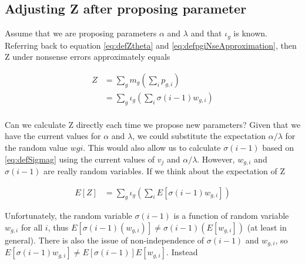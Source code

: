 \documentclass{article}
\newcommand{\elongWaitTime}{\ensuremath{w}\xspace}
\newcommand{\wgi}{\ensuremath{\elongWaitTime_{g,i}}\xspace}
\newcommand{\nseWaitTime}{\ensuremath{v}\xspace}
\newcommand{\vj}{\ensuremath{\nseWaitTime_{j}}\xspace}
\newcommand{\pgi}{\ensuremath{{p_{g,i}}}\xspace}
\newcommand{\mg}{\ensuremath{{m_g}}\xspace}
\begin{document}
\subsection*{Adjusting Z after proposing parameter}

Assume that we are proposing parameters $\alpha$ and $\lambda$ and that $\iota_g$ is known.
Referring back to equation \ref{eq:defZtheta} and \ref{eq:defpgiNseApproximation}, then Z under nonsense errors approximately equals

\begin{align}
Z &= \sum_g \mg \left(\sum_i \pgi\right)\\
 & = \sum_g \iota_g \left(\sum_i \sigma(i-1) \wgi \right) \\
\end{align}

Can we calculate Z directly each time we propose new parameters?
Given that we have the current values for $\alpha$ and $\lambda$, we could substitute the expectation $\alpha/\lambda$ for the random value $wgi$.
This would also allow us to calculate $\sigma(i-1)$ based on \ref{eq:defSigmag} using the current values of $\vj$ and $\alpha/\lambda$.
However, $\wgi$ and $\sigma(i-1)$ are really random variables.
If we think about the expectation of Z

\begin{align}
E[Z] &= \sum_g \iota_g \left(\sum_i E[\sigma(i-1) \wgi] \right)
\end{align}

Unfortunately, the random variable $\sigma(i-1)$ is a function of random variable $\wgi$ for all $i$, thus $E[\sigma(i-1)(\wgi)] \neq \sigma(i-1)(E[\wgi])$ (at least in general).
There is also the issue of non-independence of $\sigma(i-1)$ and $\wgi$, so $E[\sigma(i-1) \wgi] \neq E[\sigma(i-1)]E[\wgi]$.
Instead 
\end{document}
